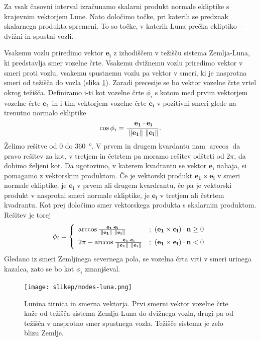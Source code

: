 \documentclass[a4paper,12pt]{article}
\renewcommand{\vec}[1]{\mathbf{#1}} %
\begin{document}
Za vsak časovni interval izračunamo skalarni 
produkt normale ekliptike s krajevnim vektorjem Lune.
Nato določimo točke, pri katerih se predznak skalarnega produkta spremeni.
To so točke, v katerih Luna prečka ekliptiko -- dvižni in spustni vozli.

Vsakemu vozlu priredimo vektor $\vec{e_i}$ z izhodiščem v težišču sistema 
Zemlja-Luna, ki predstavlja smer vozelne črte. Vsakemu dvižnemu vozlu priredimo 
vektor v smeri proti vozlu, vsakemu spustnemu vozlu pa vektor v smeri, ki je 
nasprotna smeri od težišča do vozla (slika \ref{fig:nodal}).
Zaradi precesije se bo vektor vozelne črte vrtel okrog težišča. Definiramo
i-ti kot vozelne črte $\phi_i$ s kotom med prvim vektorjem vozelne črte 
$\vec{e_1}$ in i-tim vektorjem vozelne črte $\vec{e_i}$ v pozitivni smeri glede 
na trenutno normalo ekliptike
\begin{equation*}
    \cos{\phi_i} = \frac{\: \vec{e_1} \cdot \vec{e_i}}
    {\; \norm{\vec{e_1}} \ \norm{\vec{e_i}}}.
\end{equation*}
Želimo rešitve od 0 do \SI{360}{\degree}. V prvem in drugem kvardantu nam 
$\arccos$ da pravo rešitev za kot, v tretjem in četrtem pa moramo rešitev 
odšteti od $2\pi$, da dobimo željeni kot. Da ugotovimo, v katerem kvadrantu se
vektor $\vec{e_i}$ nahaja, si pomagamo z vektorskim produktom. Če je vektorski 
produkt $\vec{e_1} \times \vec{e_i}$ v smeri normale ekliptike, je $\vec{e_i}$ 
v prvem ali drugem kvardrantu, če pa je vektorski produkt v nasprotni smeri 
normale ekliptike, je $\vec{e_i}$ v tretjem ali četrtem kvadrantu. Kot prej
določimo smer vektorskega produkta s skalarnim produktom. Rešitev je torej
\begin{equation}
    \phi_i = \left\{
        \begin{array}{ll}
            \arccos{\frac{\: \vec{e_1} \cdot \vec{e_i}}
            {\; \norm{\vec{e_1}} \ \norm{\vec{e_i}}}} & 
            {;\ (\vec{e_1}\times\vec{e_i})\cdot\vec{n} \geq 0} \vspace{0.5em} \\
            2\pi - \arccos{\frac{\: \vec{e_1} \cdot \vec{e_i}}
            {\; \norm{\vec{e_1}} \ \norm{\vec{e_i}}}} & 
            {;\ (\vec{e_1}\times\vec{e_i})\cdot\vec{n} < 0}
        \end{array}
    \right.
    \label{eq:nodal-kot}
\end{equation}
Gledano iz smeri Zemljinega severnega pola, se vozelna črta vrti v smeri 
urinega kazalca, zato se bo kot $\phi_i$ zmanjševal.

\begin{figure}[ht!]
    \centering
    \texttt{[image: slikep/nodes-luna.png]}
    \caption{Lunina tirnica in smerna vektorja. Prvi smerni vektor vozelne črte 
    kaže od težišča sistema Zemlja-Luna do dvižnega vozla, drugi pa od težišča 
    v nasprotno smer spustnega vozla. Težišče sistema je zelo blizu Zemlje.}
    \label{fig:nodal}
\end{figure}
\end{document}
